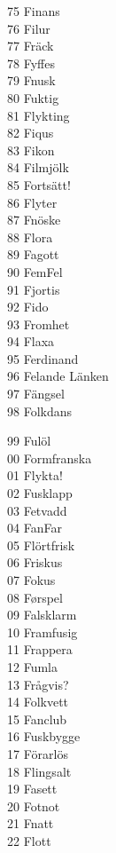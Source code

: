 \documentclass[a6paper, 10pt, twoside]{article}
\begin{document}
\begin{lyrics}
\begin{minipage}[t]{0.3\textwidth}
\physicalonly{\\}\end{minipage}\begin{minipage}[t]{0.3\textwidth}\small
75 Finans\\
76 Filur\\
77 Fräck\\
78 Fyffes\\
79 Fnusk\\
80 Fuktig\\
81 Flykting\\
82 Fiqus\\
83 Fikon\\
84 Filmjölk\\
85 Fortsätt!\\
86 Flyter\\
87 Fnöske\\
88 Flora\\
89 Fagott\\
90 FemFel\\
91 Fjortis\\
92 Fido\\
93 Fromhet\\
94 Flaxa\\
95 Ferdinand\\
96 Felande\physicalonly{\\} Länken\\
97 Fängsel \\
98 Folkdans
\physicalonly{\\}\end{minipage}\begin{minipage}[t]{0.3\textwidth}\small
99 Fulöl\\
00 Formfranska\\
01 Flykta!\\
02 Fusklapp\\
03 Fetvadd\\
04 FanFar\\
05 Flörtfrisk\\
06 Friskus\\
07 Fokus\\
08 Førspel\\
09 Falsklarm\\
10 Framfusig\\
11 Frappera\\
12 Fumla\\
13 Frågvis?\\
14 Folkvett\\
15 Fanclub\\
16 Fuskbygge\\
17 Förarlös\\
18 Flingsalt\\
19 Fasett\\
20 Fotnot\\
21 Fnatt \\
22 Flott
\end{minipage}
\end{lyrics}
\end{document}
